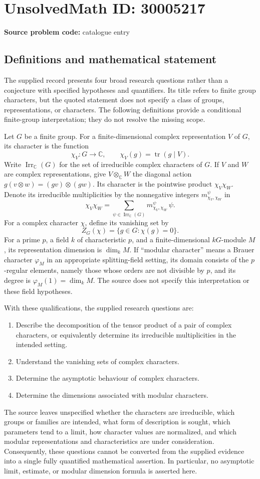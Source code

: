 \documentclass[11pt]{article}
\newcommand{\C}{\mathbb{C}}
\begin{document}
\section*{UnsolvedMath ID: 30005217}
\textbf{Source problem code:} catalogue entry
\subsection{Definitions and mathematical statement}
The supplied record presents four broad research questions rather than a conjecture with specified hypotheses and quantifiers. Its title refers to finite group characters, but the quoted statement does not specify a class of groups, representations, or characters. The following definitions provide a conditional finite-group interpretation; they do not resolve the missing scope.

Let \(G\) be a finite group. For a finite-dimensional complex representation \(V\) of \(G\), its character is the function
\[
\chi_V\colon G\longrightarrow\C,\qquad \chi_V(g)=\operatorname{tr}(g\mid V).
\]
Write \(\operatorname{Irr}_{\C}(G)\) for the set of irreducible complex characters of \(G\). If \(V\) and \(W\) are complex representations, give \(V\otimes_{\C}W\) the diagonal action \(g(v\otimes w)=(gv)\otimes(gw)\). Its character is the pointwise product \(\chi_V\chi_W\). Denote its irreducible multiplicities by the nonnegative integers \(m_{\chi_V,\chi_W}^{\psi}\) in
\[
\chi_V\chi_W=\sum_{\psi\in\operatorname{Irr}_{\C}(G)}m_{\chi_V,\chi_W}^{\psi}\,\psi.
\]
For a complex character \(\chi\), define its vanishing set by
\[
Z_G(\chi)=\{g\in G:\chi(g)=0\}.
\]
For a prime \(p\), a field \(k\) of characteristic \(p\), and a finite-dimensional \(kG\)-module \(M\), its representation dimension is \(\dim_k M\). If ``modular character'' means a Brauer character \(\varphi_M\) in an appropriate splitting-field setting, its domain consists of the \(p\)-regular elements, namely those whose orders are not divisible by \(p\), and its degree is \(\varphi_M(1)=\dim_k M\). The source does not specify this interpretation or these field hypotheses.

With these qualifications, the supplied research questions are:
\begin{enumerate}
\item Describe the decomposition of the tensor product of a pair of complex characters, or equivalently determine its irreducible multiplicities in the intended setting.
\item Understand the vanishing sets of complex characters.
\item Determine the asymptotic behaviour of complex characters.
\item Determine the dimensions associated with modular characters.
\end{enumerate}
The source leaves unspecified whether the characters are irreducible, which groups or families are intended, what form of description is sought, which parameters tend to a limit, how character values are normalized, and which modular representations and characteristics are under consideration. Consequently, these questions cannot be converted from the supplied evidence into a single fully quantified mathematical assertion. In particular, no asymptotic limit, estimate, or modular dimension formula is asserted here.
\end{document}
